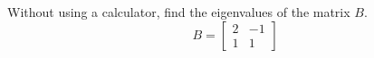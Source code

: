 Without using a calculator, find the eigenvalues of the matrix $B$.
%
\begin{equation*}
B=
\begin{bmatrix}
 2 & -1 \\
 1 & 1
\end{bmatrix}
\end{equation*}
%